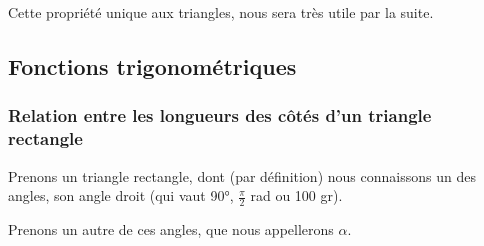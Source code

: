 \documentclass[a4paper]{article}
\begin{document}
			\begin{center}
			\end{center}

			Cette propriété unique aux triangles, nous sera très utile par la suite.

			\medbreak


\newpage
		
		\subsection{Fonctions trigonométriques}

		\subsubsection{Relation entre les longueurs des côtés d'un triangle rectangle}

			Prenons un triangle rectangle, 
			dont (par définition) nous connaissons un des angles, 
			son angle droit (qui vaut 90°, $\frac{\pi}{2}$ rad ou 100 gr).

			Prenons un autre de ces angles, que nous appellerons $\alpha$. 
			
\end{document}
